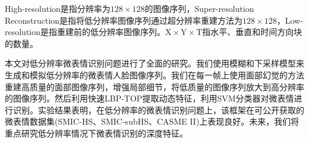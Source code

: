 High-resolution是指分辨率为$ 128 \times 128 $的图像序列，Super-resolution Reconstruction是指将低分辨率图像序列通过超分辨率重建方法为$ 128 \times 128 $，Low-resolution是指重建前的低分辨率图像序列。$ \mathrm{X} \times \mathrm{Y}  \times \mathrm{T} $指水平、垂直和时间方向块的数量。

本文对低分辨率微表情识别问题进行了全面的研究。我们使用模糊和下采样模型来生成和模拟低分辨率的微表情人脸图像序列。我们在每一帧上使用面部幻觉的方法重建高质量的面部图像序列，增强局部细节，将低质量的图像序列放大到高分辨率的图像序列。然后利用快速LBP-TOP提取动态特征，利用SVM分类器对微表情进行识别。实验结果表明，在低分辨率的微表情识别问题上，该框架在可公开获取的微表情数据集(SMIC-HS、SMIC-subHS、CASME II)上表现良好。未来，我们将重点研究低分辨率情况下微表情识别的深度特征。
